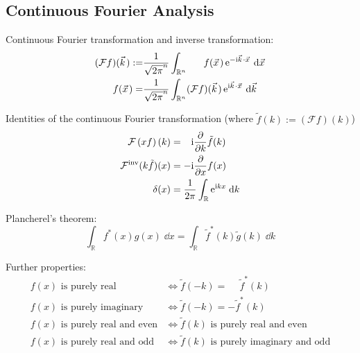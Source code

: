 		\subsection{Continuous Fourier Analysis}
			\noindent
			Continuous Fourier transformation and inverse transformation:
			\begin{equation}
				\begin{aligned}
					(\mathcal{F}f)(\vec{k}) :=& \frac{1}{\sqrt{2\pi}^n}\int_{\mathbb{R}^n} \phantom{(\mathcal{F})}f(\vec{x})\, \ex^{-\i\vec{k}\cdot\vec{x}}\;\dd\vec{x} \\
					\phantom{(\mathcal{F})}f(\vec{x}) =& \frac{1}{\sqrt{2\pi}^n}\int_{\mathbb{R}^n} (\mathcal{F}f)(\vec{k}) \,\ex^{\i\vec{k}\cdot\vec{x}}\;\dd \vec{k} \\
				\end{aligned}
			\end{equation}

			\noindent
			Identities of the continuous Fourier transformation (where $\tilde{f}(k) := \left(\mathcal{F}f\right)(k)$)
			\begin{equation}
				\begin{aligned}
					\mathcal{F}\left(xf\right)(k) &= \phantom{-}\mathrm{i} \pdv{k}\tilde{f}(k) \\
					{\mathcal{F}}^\mathrm{inv}(k\tilde{f})(x) &= -\mathrm{i}\pdv{x}f(x) \\
					\delta(x) &= \frac{1}{2\pi}\int_{\mathbb{R}}\mathrm{e}^{\mathrm{i} kx}\;\dd k
					\label{Eq:FourierIdentities}
				\end{aligned}
			\end{equation}
			
			\noindent
			Plancherel's theorem:
			\begin{equation}
				\int_{\mathbb{R}} f^{*}(x) g(x)\;\dd x =
				\int_{\mathbb{R}}\tilde{f}^{*}(k)\tilde{g}(k)\;\dd k
			\end{equation}

			\noindent
			Further properties:
			\begin{equation}
				\begin{aligned}
					f(x)\text{ is purely real} &\Leftrightarrow \tilde{f}(-k) = \phantom{-}\tilde{f}^*(k) \\
					f(x)\text{ is purely imaginary} &\Leftrightarrow \tilde{f}(-k) = -\tilde{f}^*(k) \\
					f(x)\text{ is purely real and even} &\Leftrightarrow \tilde{f}(k)\text{ is purely real and even} \\
					f(x)\text{ is purely real and odd} &\Leftrightarrow \tilde{f}(k)\text{ is purely imaginary and odd} \\
				\end{aligned}
			\end{equation}


